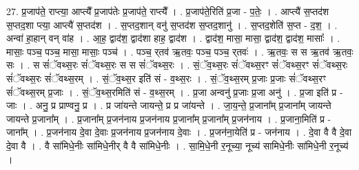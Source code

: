 \documentclass[17pt]{extarticle}
\begin{document}
27. प्र॒जाप॑ते॒ राप्त्या॒ आप्त्यै᳚ प्र॒जाप॑तेः प्र॒जाप॑ते॒ राप्त्यै᳚ । . प्र॒जाप॑ते॒रिति॑ प्र॒जा - प॒तेः॒ । . आप्त्यै॑ स॒प्तद॑श स॒प्तद॒शा प्त्या॒ आप्त्यै॑ स॒प्तद॑श । . स॒प्तद॒शान् वनु॑ स॒प्तद॑श स॒प्तद॒शानु॑ । . स॒प्तद॒शेति॑ स॒प्त - द॒श॒ । . अन्वा॑ हा॒हान् वन् वा॑ह । . आ॒ह॒ द्वाद॑श॒ द्वाद॑शा हाह॒ द्वाद॑श । . द्वाद॑श॒ मासा॒ मासा॒ द्वाद॑श॒ द्वाद॑श॒ मासाः᳚ । . मासाः॒ पञ्च॒ पञ्च॒ मासा॒ मासाः॒ पञ्च॑ । . पञ्च॒ र्‌तव॑ ऋ॒तवः॒ पञ्च॒ पञ्च॒ र्‌तवः॑ । . ऋ॒तवः॒ स स ऋ॒तव॑ ऋ॒तवः॒ सः । . स सं॑ॅवथ्स॒रः सं॑ॅवथ्स॒रः स स सं॑ॅवथ्स॒रः । . सं॒ॅव॒थ्स॒रः सं॑ॅवथ्स॒रꣳ सं॑ॅवथ्स॒रꣳ सं॑ॅवथ्स॒रः सं॑ॅवथ्स॒रः सं॑ॅवथ्स॒रम् । . सं॒ॅव॒थ्स॒र इति॑ सं - व॒थ्स॒रः । . सं॒ॅव॒थ्स॒रम् प्र॒जाः प्र॒जाः सं॑ॅवथ्स॒रꣳ सं॑ॅवथ्स॒रम् प्र॒जाः । . सं॒ॅव॒थ्स॒रमिति॑ सं - व॒थ्स॒रम् । . प्र॒जा अन्वनु॑ प्र॒जाः प्र॒जा अनु॑ । . प्र॒जा इति॑ प्र - जाः । . अनु॒ प्र प्राण्वनु॒ प्र । . प्र जा॑यन्ते जायन्ते॒ प्र प्र जा॑यन्ते । . जा॒य॒न्ते॒ प्र॒जाना᳚म् प्र॒जाना᳚म् जायन्ते जायन्ते प्र॒जाना᳚म् । . प्र॒जाना᳚म् प्र॒जन॑नाय प्र॒जन॑नाय प्र॒जाना᳚म् प्र॒जाना᳚म् प्र॒जन॑नाय । . प्र॒जाना॒मिति॑ प्र - जाना᳚म् । . प्र॒जन॑नाय दे॒वा दे॒वाः प्र॒जन॑नाय प्र॒जन॑नाय दे॒वाः । . प्र॒जन॑ना॒येति॑ प्र - जन॑नाय । . दे॒वा वै वै दे॒वा दे॒वा वै । . वै सा॑मिधे॒नीः सा॑मिधे॒नीर् वै वै सा॑मिधे॒नीः । . सा॒मि॒धे॒नी र॒नूच्या॒ नूच्य॑ सामिधे॒नीः सा॑मिधे॒नी र॒नूच्य॑ । \newline
\end{document}
